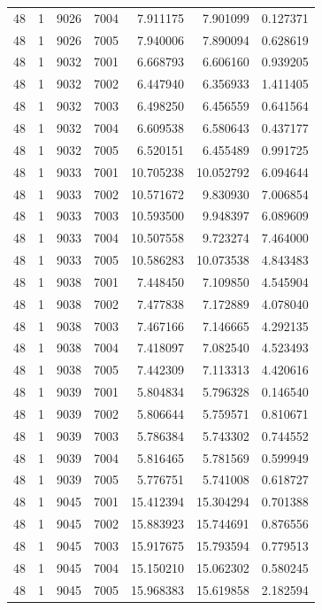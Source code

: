\begin{table}
\begin{tabular}{rrrrrrr}
48 & 1 & 9026 & 7004 & 7.911175 & 7.901099 & 0.127371 \\
48 & 1 & 9026 & 7005 & 7.940006 & 7.890094 & 0.628619 \\
48 & 1 & 9032 & 7001 & 6.668793 & 6.606160 & 0.939205 \\
48 & 1 & 9032 & 7002 & 6.447940 & 6.356933 & 1.411405 \\
48 & 1 & 9032 & 7003 & 6.498250 & 6.456559 & 0.641564 \\
48 & 1 & 9032 & 7004 & 6.609538 & 6.580643 & 0.437177 \\
48 & 1 & 9032 & 7005 & 6.520151 & 6.455489 & 0.991725 \\
48 & 1 & 9033 & 7001 & 10.705238 & 10.052792 & 6.094644 \\
48 & 1 & 9033 & 7002 & 10.571672 & 9.830930 & 7.006854 \\
48 & 1 & 9033 & 7003 & 10.593500 & 9.948397 & 6.089609 \\
48 & 1 & 9033 & 7004 & 10.507558 & 9.723274 & 7.464000 \\
48 & 1 & 9033 & 7005 & 10.586283 & 10.073538 & 4.843483 \\
48 & 1 & 9038 & 7001 & 7.448450 & 7.109850 & 4.545904 \\
48 & 1 & 9038 & 7002 & 7.477838 & 7.172889 & 4.078040 \\
48 & 1 & 9038 & 7003 & 7.467166 & 7.146665 & 4.292135 \\
48 & 1 & 9038 & 7004 & 7.418097 & 7.082540 & 4.523493 \\
48 & 1 & 9038 & 7005 & 7.442309 & 7.113313 & 4.420616 \\
48 & 1 & 9039 & 7001 & 5.804834 & 5.796328 & 0.146540 \\
48 & 1 & 9039 & 7002 & 5.806644 & 5.759571 & 0.810671 \\
48 & 1 & 9039 & 7003 & 5.786384 & 5.743302 & 0.744552 \\
48 & 1 & 9039 & 7004 & 5.816465 & 5.781569 & 0.599949 \\
48 & 1 & 9039 & 7005 & 5.776751 & 5.741008 & 0.618727 \\
48 & 1 & 9045 & 7001 & 15.412394 & 15.304294 & 0.701388 \\
48 & 1 & 9045 & 7002 & 15.883923 & 15.744691 & 0.876556 \\
48 & 1 & 9045 & 7003 & 15.917675 & 15.793594 & 0.779513 \\
48 & 1 & 9045 & 7004 & 15.150210 & 15.062302 & 0.580245 \\
48 & 1 & 9045 & 7005 & 15.968383 & 15.619858 & 2.182594 \\

\end{tabular}
\end{table}
